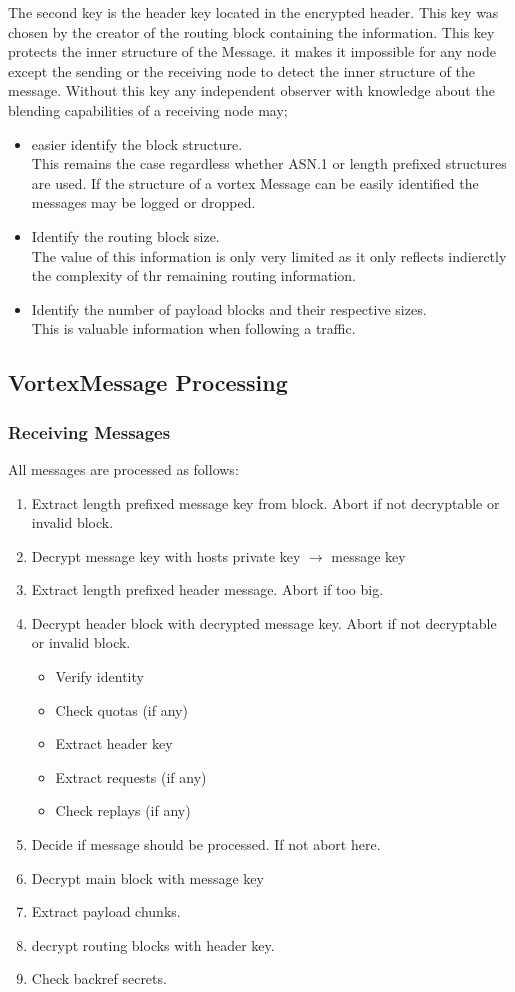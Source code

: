 The second key is the header key located in the encrypted header. This key was chosen by the creator of the routing block containing the information. This key protects the inner structure of the Message. it makes it impossible for any node except the sending or the receiving node to detect the inner structure of the message. Without this key any independent observer with knowledge about the blending capabilities of a receiving node may;
\begin{itemize}
	\item easier identify the block structure.\\ 
	This remains the case regardless whether ASN.1 or length prefixed structures are used. If the structure of a vortex Message can be easily identified the messages may be logged or dropped.
	\item Identify the routing block size.\\
	The value of this information is only very limited as it only reflects indierctly the complexity of thr remaining routing information.
	\item Identify the number of payload blocks and their respective sizes. \\
	This is valuable information when following a traffic.
\end{itemize}

\subsection{VortexMessage Processing}
\subsubsection{Receiving Messages}
All messages are processed as follows:
\begin{enumerate}
	\item Extract length prefixed message key from block. Abort if not decryptable or invalid block.
	\item Decrypt message key with hosts private key $\rightarrow$ message key
	\item Extract length prefixed header message. Abort if too big.
	\item Decrypt header block with decrypted message key. Abort if not decryptable or invalid block.
	\begin{itemize}
		\item Verify identity
		\item Check quotas (if any)
		\item Extract header key
		\item Extract requests (if any)
		\item Check replays (if any)
	\end{itemize}
	\item Decide if message should be processed. If not abort here.
	\item Decrypt main block with message key
	\item Extract payload chunks.
	\item decrypt routing blocks with header key.
	\item Check backref secrets.
\end{enumerate}


